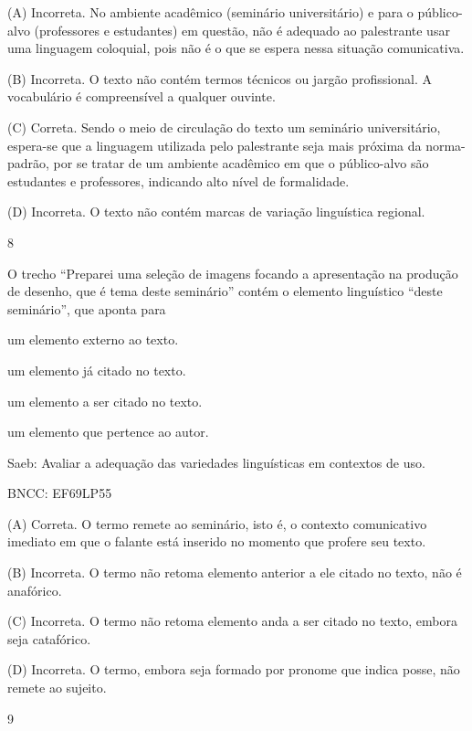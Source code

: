 (A) Incorreta. No ambiente acadêmico (seminário universitário) e para o
público-alvo (professores e estudantes) em questão, não é adequado ao
palestrante usar uma linguagem coloquial, pois não é o que se espera
nessa situação comunicativa.

(B) Incorreta. O texto não contém termos técnicos ou jargão
profissional. A vocabulário é compreensível a qualquer ouvinte.

(C) Correta. Sendo o meio de circulação do texto um seminário
universitário, espera-se que a linguagem utilizada pelo palestrante seja
mais próxima da norma-padrão, por se tratar de um ambiente acadêmico em
que o público-alvo são estudantes e professores, indicando alto nível de
formalidade.

(D) Incorreta. O texto não contém marcas de variação linguística
regional.

\num{8}

O trecho ``Preparei uma seleção de imagens focando a apresentação na
produção de desenho, que é tema deste seminário'' contém o elemento
linguístico ``deste seminário'', que aponta para

\begin{escolha}
\item um elemento externo ao texto.

\item um elemento já citado no texto.

\item um elemento a ser citado no texto.

\item um elemento que pertence ao autor.
\end{escolha}

Saeb: Avaliar a adequação das variedades linguísticas em contextos de
uso.

BNCC: EF69LP55

(A) Correta. O termo remete ao seminário, isto é, o contexto
comunicativo imediato em que o falante está inserido no momento que
profere seu texto.

(B) Incorreta. O termo não retoma elemento anterior a ele citado no
texto, não é anafórico.

(C) Incorreta. O termo não retoma elemento anda a ser citado no texto,
embora seja catafórico.

(D) Incorreta. O termo, embora seja formado por pronome que indica
posse, não remete ao sujeito.

\num{9}

